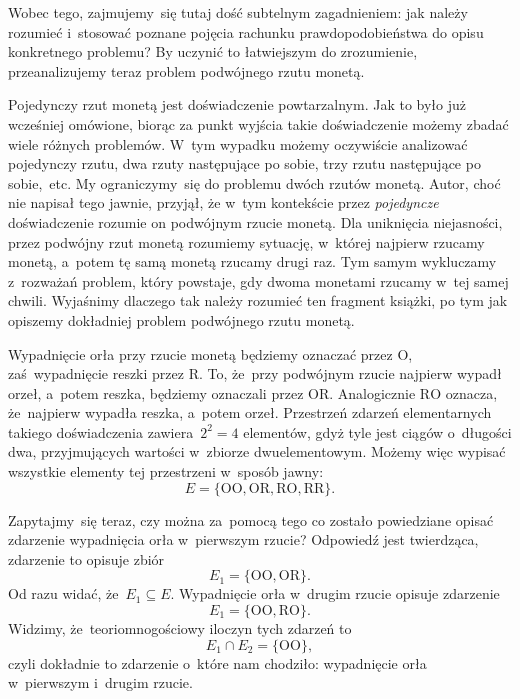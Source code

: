 \documentclass[a4paper,11pt]{article}
\numberwithin{equation}{section}
\newcommand{\Orzel}{\text{O}}
\newcommand{\Reszka}{\text{R}}
\begin{document}
Wobec tego, zajmujemy~się tutaj dość subtelnym zagadnieniem: jak należy
rozumieć i~stosować poznane pojęcia rachunku prawdopodobieństwa do opisu
konkretnego problemu? By uczynić to łatwiejszym do zrozumienie,
przeanalizujemy teraz problem podwójnego rzutu monetą.

Pojedynczy rzut monetą jest doświadczenie powtarzalnym. Jak to było
już wcześniej omówione, biorąc za punkt wyjścia takie doświadczenie możemy
zbadać wiele różnych problemów. W~tym wypadku możemy oczywiście analizować
pojedynczy rzutu, dwa rzuty następujące po sobie, trzy rzutu następujące po
sobie,~etc. My ograniczymy~się do problemu dwóch rzutów monetą. Autor, choć
nie napisał tego jawnie, przyjął, że w~tym kontekście przez
\textit{pojedyncze} doświadczenie rozumie on podwójnym rzucie monetą. Dla
uniknięcia niejasności, przez podwójny rzut monetą rozumiemy sytuację,
w~której najpierw rzucamy monetą, a~potem tę samą monetą rzucamy drugi raz.
Tym samym wykluczamy z~rozważań problem, który powstaje, gdy dwoma monetami
rzucamy w~tej samej chwili. Wyjaśnimy dlaczego tak należy rozumieć ten
fragment książki, po tym jak opiszemy dokładniej problem podwójnego rzutu
monetą.

Wypadnięcie orła przy rzucie monetą będziemy oznaczać przez $\Orzel$,
zaś~wypadnięcie reszki przez $\Reszka$. To, że~przy podwójnym rzucie
najpierw wypadł orzeł, a~potem reszka, będziemy oznaczali przez $\Orzel
\Reszka$. Analogicznie $\Reszka \Orzel$ oznacza, że~najpierw wypadła reszka,
a~potem orzeł. Przestrzeń zdarzeń elementarnych takiego doświadczenia
zawiera~$2^{ 2 } = 4$ elementów, gdyż tyle jest ciągów o~długości dwa,
przyjmujących wartości w~zbiorze dwuelementowym. Możemy więc wypisać
wszystkie elementy tej przestrzeni w~sposób jawny:
\begin{equation}
  \label{eq:Hellwig-Elementy-ETC-01}
  E = \{ \Orzel \Orzel, \Orzel \Reszka, \Reszka \Orzel, \Reszka \Reszka \}.
\end{equation}

Zapytajmy~się teraz, czy można za~pomocą tego co zostało powiedziane opisać
zdarzenie wypadnięcia orła w~pierwszym rzucie? Odpowiedź jest twierdząca,
zdarzenie to opisuje zbiór
\begin{equation}
  \label{eq:Hellwig-Elementy-02}
  E_{ 1 } = \{ \Orzel \Orzel, \Orzel \Reszka \}.
\end{equation}
Od razu widać, że~$E_{ 1 } \subseteq E$. Wypadnięcie orła w~drugim rzucie opisuje
zdarzenie
\begin{equation}
  \label{eq:Hellwig-Elementy-03}
  E_{ 1 } = \{ \Orzel \Orzel, \Reszka \Orzel \}.
\end{equation}
Widzimy, że~teoriomnogościowy iloczyn tych zdarzeń to
\begin{equation}
  \label{eq:Hellwig-Elementy-03}
  E_{ 1 } \cap E_{ 2 } = \{ \Orzel \Orzel \},
\end{equation}
czyli dokładnie to zdarzenie o~które nam chodziło: wypadnięcie orła
w~pierwszym i~drugim rzucie.
\end{document}
